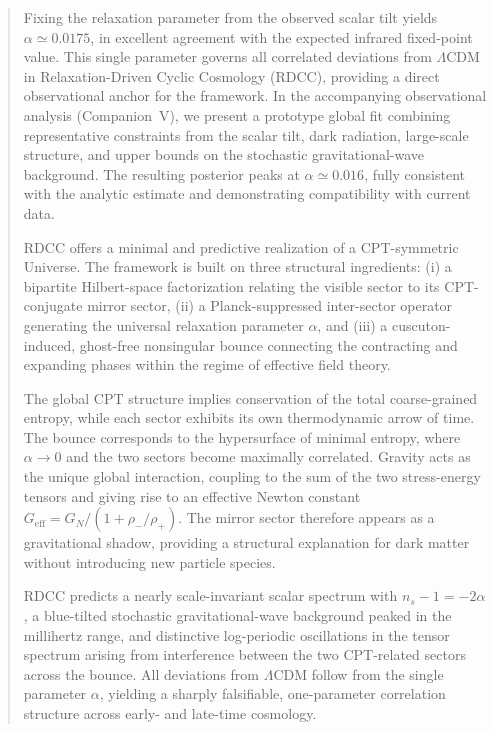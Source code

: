 \documentclass[11pt,a4paper]{article}
\begin{document}
\begin{abstract}
Fixing the relaxation parameter from the observed scalar tilt yields
$\alpha \simeq 0.0175$, in excellent agreement with the expected infrared
fixed-point value. This single parameter governs all correlated deviations
from $\Lambda$CDM in Relaxation-Driven Cyclic Cosmology (RDCC), providing a
direct observational anchor for the framework. In the accompanying
observational analysis (Companion~V), we present a prototype global fit
combining representative constraints from the scalar tilt, dark radiation,
large-scale structure, and upper bounds on the stochastic gravitational-wave
background. The resulting posterior peaks at $\alpha \simeq 0.016$, fully
consistent with the analytic estimate and demonstrating compatibility with
current data.

RDCC offers a minimal and predictive realization of a CPT-symmetric Universe.
The framework is built on three structural ingredients: (i) a bipartite
Hilbert-space factorization relating the visible sector to its CPT-conjugate
mirror sector, (ii) a Planck-suppressed inter-sector operator generating the
universal relaxation parameter $\alpha$, and (iii) a cuscuton-induced,
ghost-free nonsingular bounce connecting the contracting and expanding phases
within the regime of effective field theory.

The global CPT structure implies conservation of the total coarse-grained
entropy, while each sector exhibits its own thermodynamic arrow of time. The
bounce corresponds to the hypersurface of minimal entropy, where
$\alpha \rightarrow 0$ and the two sectors become maximally correlated. Gravity
acts as the unique global interaction, coupling to the sum of the two
stress-energy tensors and giving rise to an effective Newton constant
$G_{\mathrm{eff}} = G_{N}/(1 + \rho_{-}/\rho_{+})$. The mirror sector therefore
appears as a gravitational shadow, providing a structural explanation for dark
matter without introducing new particle species.

RDCC predicts a nearly scale-invariant scalar spectrum with $n_{s}-1=-2\alpha$,
a blue-tilted stochastic gravitational-wave background peaked in the
millihertz range, and distinctive log-periodic oscillations in the tensor
spectrum arising from interference between the two CPT-related sectors across
the bounce. All deviations from $\Lambda$CDM follow from the single parameter
$\alpha$, yielding a sharply falsifiable, one-parameter correlation structure
across early- and late-time cosmology.
\end{abstract}
\end{document}
